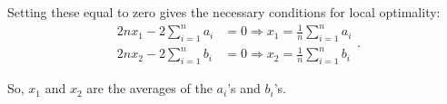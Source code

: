 \begin{homeworkProblem}
\begin{solution}
        Setting these equal to zero gives the necessary conditions for local optimality:
        \[
            \begin{split}
                2n x_1 - 2\sum_{i=1}^n a_i &= 0 \Rightarrow x_1 = \frac{1}{n}\sum_{i=1}^n a_i \\
                2n x_2 - 2\sum_{i=1}^n b_i &= 0 \Rightarrow x_2 = \frac{1}{n}\sum_{i=1}^n b_i
            \end{split}.
        \]

        So, $x_1$ and $x_2$ are the averages of the $a_i$'s and $b_i$'s.

    \end{solution}

\end{homeworkProblem}
